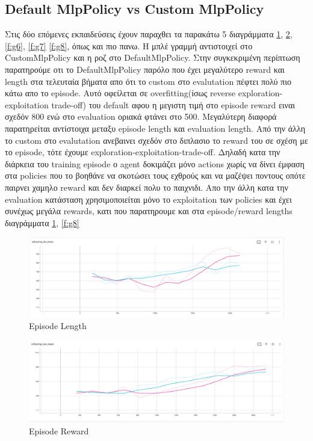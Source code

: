 \clearpage 


\subsection{Default MlpPolicy vs Custom MlpPolicy}

Στις δύο επόμενες εκπαιδεύσεις έχουν παραχθει τα παρακάτω 5 διαγράμματα \ref{f:g41}, \ref{f:g51}, \ref{f:g6}, \ref{f:g7} \ref{f:g8}, όπως και πιο πανω. Η μπλέ γραμμή αντιστοιχεί στο CustomMlpPolicy και η ροζ στο DefaultMlpPolicy. Στην συγκεκριμένη περίπτωση παρατηρούμε οτι 
το DefaultMlpPolicy παρόλο που έχει μεγαλύτερο reward και length στα τελευταία βήματα απο ότι το custom στο evalutation πέφτει πολύ πιο κάτω απο το episode. Αυτό οφείλεται σε overfitting(ίσως reverse exploration-exploitation trade-off) του default αφου η μεγιστη τιμή στο episode reward ειναι σχεδόν 800 ενώ στο evaluation οριακά φτάνει στο 500. Μεγαλύτερη διαφορά παρατηρείται αντίστοιχα μεταξυ episode length και evaluation length. Από την άλλη το custom στο evalutation ανεβαινει σχεδόν στο διπλασιο το reward του σε σχέση με το episode, τότε έχουμε exploration-exploitation-trade-off. Δηλαδή κατα την διάρκεια του training episode ο agent δοκιμάζει μόνο actions χωρίς να δίνει έμφαση στα policies που το βοηθάνε να σκοτώσει τους εχθρούς και να μαζέψει ποντους οπότε παιρνει χαμηλο reward και δεν διαρκεί πολυ το παιχνιδι. Απο την άλλη κατα την evaluation κατάσταση χρησιμοποιείται μόνο το exploitation των policies και έχει συνέχως μεγάλα rewards, κατι που παρατηρουμε και στα episode/reward lengths διαγράμματα \ref{f:g41}, \ref{f:g8}



\begin{figure}[ht]
	\centering
	\includegraphics[width=1\linewidth]{Results/PPO_MLP/ep_length.png}
	\caption{ Episode Length}
	\label{f:g41}	
\end{figure}


\begin{figure}[ht]
	\centering
	\includegraphics[width=1\linewidth]{Results/PPO_MLP/ep_reward.png}
	\caption{ Episode Reward }
	\label{f:g51}	
\end{figure}


